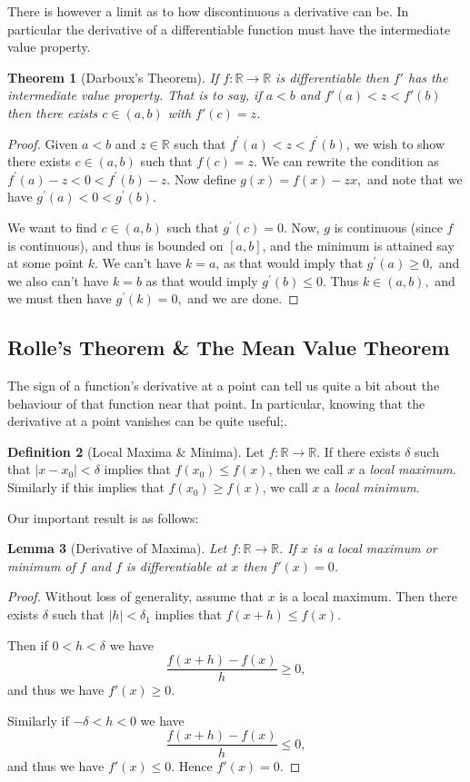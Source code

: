 \documentclass[11pt, a4paper]{article}
\newtheorem{theorem}{Theorem}[section]
\newtheorem{lemma}[theorem]{Lemma}
\theoremstyle{definition}
\newtheorem{definition}[theorem]{Definition}
\newcommand{\vocab}[1]{\emph{#1}} %
\newcommand{\R}{\mathbb{R}}
\begin{document}
There is however a limit as to how discontinuous a derivative can be. In particular the derivative of a differentiable function must have the intermediate value property.

\begin{theorem}[Darboux's Theorem]
	If $f: \R \rightarrow \R$ is differentiable then $f'$ has the intermediate value property. That is to say, if $a < b$ and $f'(a) < z < f'(b)$ then there exists $c \in (a, b)$ with $f'(c) = z$.
\end{theorem}
\begin{proof}
Given $a<b$ and $z \in \mathbb{R}$ such that $f^{\prime}(a)<z<f^{\prime}(b)$, we wish to show there exists $c \in(a, b)$ such that $f(c)=z$. We can rewrite the condition as $f^{\prime}(a)-z<0<f^{\prime}(b)-z$. Now define $g(x)=f(x)-z x,$ and note that we have $g^{\prime}(a)<0<g^{\prime}(b)$.

We want to find $c \in(a, b)$ such that $g^{\prime}(c)=0$. Now, $g$ is continuous (since $f$ is continuous), and thus is bounded on $[a, b]$, and the minimum is attained say at some point $k$. We can't have $k=a$, as that would imply that $g^{\prime}(a) \geq 0,$ and we also can't have $k=b$ as that would imply $g^{\prime}(b) \leq 0$. Thus $k \in(a, b),$ and we must then have $g^{\prime}(k)=0,$ and we are done.
\end{proof}

\subsection{Rolle's Theorem \& The Mean Value Theorem}

The sign of a function's derivative at a point can tell us quite a bit about the behaviour of that function near that point.
In particular, knowing that the derivative at a point vanishes can be quite useful;.

\begin{definition}[Local Maxima \& Minima]
	Let $f: \R \rightarrow \R$. If there exists $\delta$ such that $|x - x_0| < \delta$ implies that $f(x_0) \leq f(x)$, then we call $x$ a \vocab{local maximum}. 
	Similarly if this implies that $f(x_0) \geq f(x)$, we call $x$ a \vocab{local minimum}. 
\end{definition}

Our important result is as follows:

\begin{lemma}[Derivative of Maxima]\label{lemma:maxima}
	Let $f: \R \rightarrow \R$. If $x$ is a local maximum or minimum of $f$ and $f$ is differentiable at $x$ then $f'(x) = 0$.
\end{lemma}
\begin{proof}
	Without loss of generality, assume that $x$ is a local maximum. Then there exists $\delta$ such that $|h| < \delta_1$ implies that $f(x + h) \leq f(x)$. 
	
	Then if $0 < h < \delta$ we have
	$$
		\frac{f(x + h) - f(x)}{h} \geq 0,
	$$
	and thus we have $f'(x) \geq 0$.

	Similarly if $- \delta < h < 0$ we have
	$$
	\frac{f(x + h) - f(x)}{h} \leq 0,
	$$
	and thus we have $f'(x) \leq 0$. Hence $f'(x) = 0$.
\end{proof}
\end{document}
